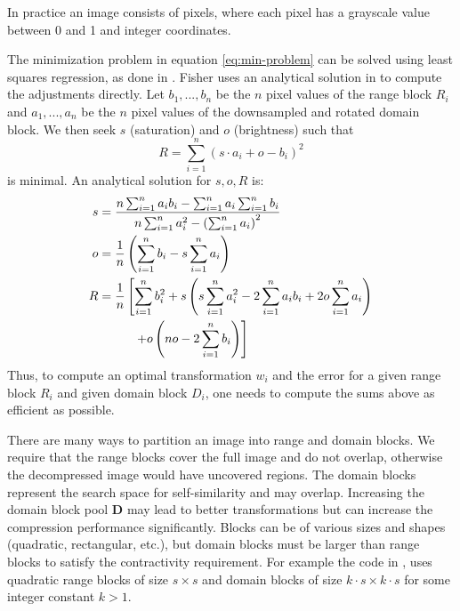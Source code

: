  \label{par-practical-implementation}
In practice an image consists of pixels, where each pixel has a grayscale value between 0 and 1 and integer coordinates.

The minimization problem in equation \ref{eq:min-problem} can be solved using least squares regression, as done in \cite{github-python}.
Fisher uses an analytical solution in \cite{fisher2012} to compute the adjustments directly. Let $b_1, ..., b_n$ be the $n$ pixel values of the range block $R_i$
and $a_1,...,a_n$ be the $n$ pixel values of the downsampled and rotated domain block. We then seek $s$ (saturation) and $o$ (brightness) such that
$$
R = \sum_{i=1}^n (s \cdot a_i + o - b_i)^2
$$
is minimal. An analytical solution for $s,o,R$ is:
\begin{align}
    s &= \frac{n \sum_{i=1}^n a_i b_i - \sum_{i=1}^n a_i \sum_{i=1}^n b_i}{n \sum_{i=1}^n a_i^2 - \left(\sum_{i=1}^n a_i \right)^2} \label{contrast}\\
    o &= \frac{1}{n} \left( \sum_{i=1}^n b_i - s \sum_{i=1}^n a_i \right) \label{brightness}\\
    R &= \frac{1}{n} \left[ \sum_{i=1}^n b_i^2 + s \left( s \sum_{i=1}^n a_i^2 - 2 \sum_{i=1}^n a_i b_i + 2o \sum_{i=1}^n a_i \right) \right. \notag\\
    &\text{\hspace{1cm}} \left. + o \left(no - 2 \sum_{i=1}^n b_i \right)  \right]\label{error}
    \end{align}
Thus, to compute an optimal transformation $w_i$ and the error for a given range block $R_i$ and given domain block $D_i$, one needs to compute the sums above
as efficient as possible.

 There are many ways to partition an image into range
and domain blocks. We require that the range blocks cover the full image and do
not overlap, otherwise the decompressed image would have uncovered regions. The
domain blocks represent the search space for self-similarity and may overlap.
Increasing the domain block pool $\boldsymbol{D}$ may lead to better
transformations but can increase the compression performance significantly.
Blocks can be of various sizes and shapes (quadratic, rectangular, etc.), but
domain blocks must be larger than range blocks to satisfy the contractivity
requirement. For example the code in \cite{github-python}, uses quadratic range
blocks of size $s \times s$ and domain blocks of size
$k\cdot s \times k \cdot s$ for some integer constant $k > 1$.

